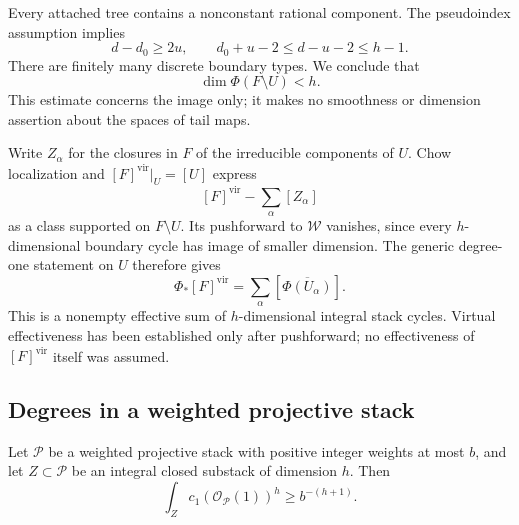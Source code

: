 Every attached tree contains a nonconstant rational component.
The pseudoindex assumption implies
\[
  d-d_0\ge2u,\qquad
  d_0+u-2\le d-u-2\le h-1.
\]
There are finitely many discrete boundary types.  We conclude that
\[
  \dim\Phi(F\setminus U)<h.
\]
This estimate concerns the image only; it makes no smoothness or
dimension assertion about the spaces of tail maps.

Write \(Z_\alpha\) for the closures in \(F\) of the irreducible
components of \(U\).  Chow localization and
\([F]^{\mathrm{vir}}|_U=[U]\) express
\[
  [F]^{\mathrm{vir}}-\sum_\alpha[Z_\alpha]
\]
as a class supported on \(F\setminus U\).  Its pushforward to
\(\mathcal W\) vanishes, since every \(h\)-dimensional boundary cycle
has image of smaller dimension.  The generic degree-one statement
on \(U\) therefore gives
\[
  \Phi_*[F]^{\mathrm{vir}}
    =\sum_\alpha[\overline{\Phi(U_\alpha)}].
\]
This is a nonempty effective sum of \(h\)-dimensional integral
stack cycles.  Virtual effectiveness has been established only
after pushforward; no effectiveness of \([F]^{\mathrm{vir}}\)
itself was assumed.

\subsection{Degrees in a weighted projective stack}

\begin{lemma}
\label{lem:weighted-degree-lower}
Let \(\mathcal P\) be a weighted projective stack with positive
integer weights at most \(b\), and let \(Z\subset\mathcal P\) be an
integral closed substack of dimension \(h\).  Then
\[
  \int_Z c_1(\mathcal O_{\mathcal P}(1))^h
  \ge b^{-(h+1)}.
\]
\end{lemma}

